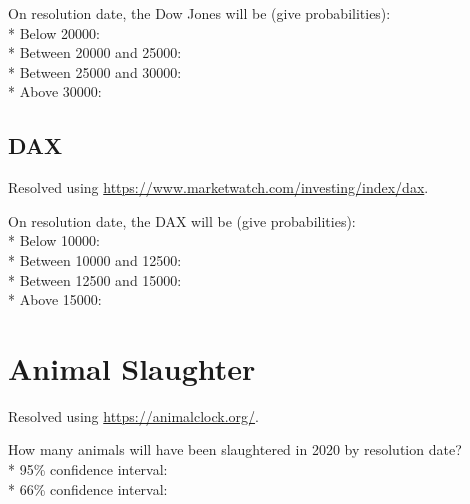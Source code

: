 \documentclass{article}
\begin{document}
On resolution date, the Dow Jones will be (give probabilities):\\*
Below 20000: \null\hfill\underline{\hspace{5cm}}\\*
Between 20000 and 25000: \null\hfill\underline{\hspace{5cm}}\\*
Between 25000 and 30000: \null\hfill\underline{\hspace{5cm}}\\*
Above 30000: \null\hfill\underline{\hspace{5cm}}

\subsection*{DAX}

Resolved using
\href{https://www.marketwatch.com/investing/index/dax}{https://www.marketwatch.com/investing/index/dax}.

\vspace{0.3cm}

On resolution date, the DAX will be (give probabilities):\\*
Below 10000: \null\hfill\underline{\hspace{5cm}}\\*
Between 10000 and 12500: \null\hfill\underline{\hspace{5cm}}\\*
Between 12500 and 15000: \null\hfill\underline{\hspace{5cm}}\\*
Above 15000: \null\hfill\underline{\hspace{5cm}}

\section*{Animal Slaughter}

Resolved using \href{https://animalclock.org/}{https://animalclock.org/}.

\vspace{0.3cm}

How many animals will have been slaughtered in 2020 by resolution date?\\*
95\% confidence interval: \null\hfill\underline{\hspace{8cm}}\\*
66\% confidence interval: \null\hfill\underline{\hspace{8cm}}
\end{document}
